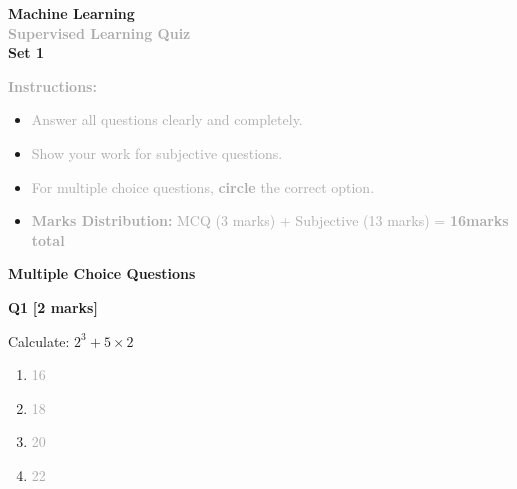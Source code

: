 \documentclass[11pt]{article}
\begin{document}
\begin{center}
  {\Huge\textcolor{primaryblue}{\textbf{Machine Learning}}} \\[5pt]
  {\LARGE\textcolor{darkgray}{\textbf{Supervised Learning Quiz}}} \\[3pt]
  {\Large\textcolor{secondaryblue}{\textbf{Set 1}}}
\end{center}

\vspace{20pt}

\begin{instructionbox}
\textcolor{darkgray}{\textbf{\large Instructions:}}
\begin{itemize}[leftmargin=20pt, itemsep=3pt]
  \item \textcolor{darkgray}{Answer all questions clearly and completely.}
  \item \textcolor{darkgray}{Show your work for subjective questions.}
  \item \textcolor{darkgray}{For multiple choice questions, \textbf{circle} the correct option.}
  \item \textcolor{darkgray}{\textbf{Marks Distribution:} MCQ (3 marks) + Subjective (13 marks) = \textbf{16marks total}}
\end{itemize}
\end{instructionbox}

\vspace{15pt}


\begin{center}
  \textcolor{primaryblue}{\Large\textbf{Multiple Choice Questions}}
\end{center}
\vspace{10pt}


\begin{mcqbox}
\textcolor{primaryblue}{\textbf{\large Q1}} \hfill \textcolor{accentorange}{\textbf{[2 marks]}}
\vspace{8pt}

Calculate: $2^3 + 5 \times 2$

\vspace{8pt}
\begin{enumerate}[label=\textbf{(\Alph*)}, leftmargin=25pt, itemsep=4pt]

  \item \textcolor{darkgray}{16}

  \item \textcolor{darkgray}{18}

  \item \textcolor{darkgray}{20}

  \item \textcolor{darkgray}{22}

\end{enumerate}
\end{mcqbox}
\vspace{8pt}
\end{document}
